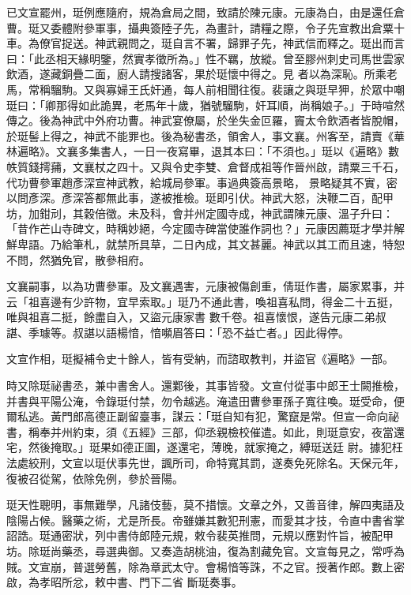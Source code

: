 \begin{pinyinscope}
 已文宣罷州，珽例應隨府，規為倉局之間，致請於陳元康。元康為白，由是還任倉曹。珽又委體附參軍事，攝典簽陸子先，為畫計，請糧之際，令子先宣教出倉粟十車。為僚官捉送。神武親問之，珽自言不署，歸罪子先，神武信而釋之。珽出而言曰：「此丞相天緣明鑒，然實孝徵所為。」性不羈，放縱。曾至膠州刺史司馬世雲家飲酒，遂藏銅疊二面，廚人請搜諸客，果於珽懷中得之。見
 者以為深恥。所乘老馬，常稱騮駒。又與寡婦王氏奸通，每人前相聞往復。裴讓之與珽早狎，於眾中嘲珽曰：「卿那得如此詭異，老馬年十歲，猶號騮駒，奸耳順，尚稱娘子。」于時喧然傳之。後為神武中外府功曹。神武宴僚屬，於坐失金叵羅，竇太令飲酒者皆脫帽，於珽髻上得之，神武不能罪也。後為秘書丞，領舍人，事文襄。州客至，請賣《華林遍略》。文襄多集書人，一日一夜寫畢，退其本曰：「不須也。」珽以《遍略》數帙質錢摴蒱，文襄杖之四十。又與令史李雙、倉督成祖等作晉州啟，請粟三千石，代功曹參軍趙彥深宣神武教，給城局參軍。事過典簽高景略，
 景略疑其不實，密以問彥深。彥深答都無此事，遂被推檢。珽即引伏。神武大怒，決鞭二百，配甲坊，加鉗刓，其穀倍徵。未及科，會并州定國寺成，神武謂陳元康、溫子升曰：「昔作芒山寺碑文，時稱妙絕，今定國寺碑當使誰作詞也？」元康因薦珽才學并解鮮卑語。乃給筆札，就禁所具草，二日內成，其文甚麗。神武以其工而且速，特恕不問，然猶免官，散參相府。



 文襄嗣事，以為功曹參軍。及文襄遇害，元康被傷創重，倩珽作書，屬家累事，并云「祖喜邊有少許物，宜早索取。」珽乃不通此書，喚祖喜私問，得金二十五挺，唯與祖喜二挺，餘盡自入，又盜元康家書
 數千卷。祖喜懷恨，遂告元康二弟叔諶、季璩等。叔諶以語楊愔，愔嚬眉答曰：「恐不益亡者。」因此得停。



 文宣作相，珽擬補令史十餘人，皆有受納，而諮取教判，并盜官《遍略》一部。



 時又除珽祕書丞，兼中書舍人。還鄴後，其事皆發。文宣付從事中郎王士闕推檢，并書與平陽公淹，令錄珽付禁，勿令越逃。淹遣田曹參軍孫子寬往喚。珽受命，便爾私逃。黃門郎高德正副留臺事，謀云：「珽自知有犯，驚竄是常。但宣一命向祕書，稱奉并州約束，須《五經》三部，仰丞親檢校催遣。如此，則珽意安，夜當還宅，然後掩取。」珽果如德正圖，遂還宅，薄晚，就家掩之，縛珽送廷
 尉。據犯枉法處絞刑，文宣以珽伏事先世，諷所司，命特寬其罰，遂奏免死除名。天保元年，復被召從駕，依除免例，參於晉陽。



 珽天性聰明，事無難學，凡諸伎藝，莫不措懷。文章之外，又善音律，解四夷語及陰陽占候。醫藥之術，尤是所長。帝雖嫌其數犯刑憲，而愛其才技，令直中書省掌詔誥。珽通密狀，列中書侍郎陸元規，敕令裴英推問，元規以應對忤旨，被配甲坊。除珽尚藥丞，尋選典御。又奏造胡桃油，復為割藏免官。文宣每見之，常呼為賊。文宣崩，普選勞舊，除為章武太守。會楊愔等誅，不之官。授著作郎。數上密啟，為孝昭所忿，敕中書、門下二省
 斷珽奏事。




\end{pinyinscope}
